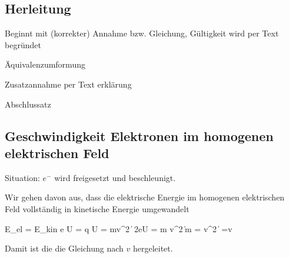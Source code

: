 \subsection{Herleitung}

\startitemize[packed]
\item Beginnt mit (korrekter) Annahme bzw. Gleichung, Gültigkeit wird per Text begründet
\item Äquivalenzumformung
\item Zusatzannahme per Text erklärung
\item Abschlussatz
\stopitemize

\subsection{Geschwindigkeit Elektronen im homogenen elektrischen Feld}

\startframedtask
Situation: $e^-$ wird freigesetzt und beschleunigt.

Wir gehen davon aus, dass die elektrische Energie im homogenen elektrischen Feld vollständig in kinetische Energie umgewandelt
\stopframedtask

\startformula
\startalign[n=4]
\NC E_{el} \NC = E_{kin} \NC \NC \NR
\NC e \cdot U = q \cdot U \NC =  mv^2 \NC \quad \|  \NC \NR
\NC 2eU \NC = m \cdot v^2 \NC \quad \| \div m \NC \NR
\NC {} \NC = v^2 \NC \quad \| \sqrt{} \NC \NR
\NC {}\NC =v  \NC \NC \NR
\stopalign
\stopformula
\stopplaceformula

Damit ist die die Gleichung nach $v$ hergeleitet.


